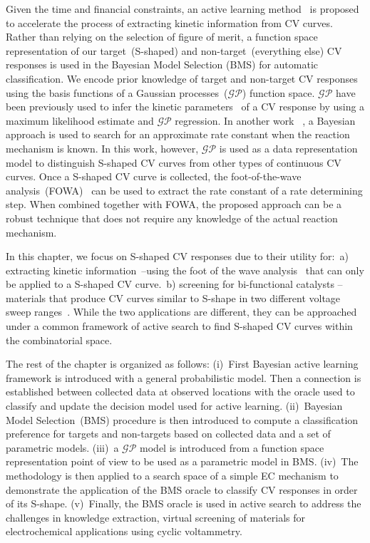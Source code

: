 Given the time and financial constraints, an active learning method~\cite{jiang2018efficient,RGActiveIntro, GardnerALIntro} is proposed to accelerate the process of extracting kinetic information from CV curves. 
Rather than relying on the selection of figure of merit, a function space representation of our target~(S-shaped) and non-target~(everything else) CV responses is used in the Bayesian Model Selection (BMS) for automatic classification. 
We encode prior knowledge of target and non-target CV responses using the basis functions of a Gaussian processes~(\(\mathcal{GP}\)) function space.
\(\mathcal{GP}\) have been previously used to infer the kinetic parameters~\cite{gavaghan2018use,robinson2018separating} of a CV response by using a maximum likelihood estimate and \(\mathcal{GP}\) regression. 
In another work ~\cite{li2019application}, a Bayesian approach is used to search for an approximate rate constant when the reaction mechanism is known. 
In this work, however, \(\mathcal{GP}\) is used as a data representation model to distinguish S-shaped CV curves from other types of continuous CV curves. 
Once a S-shaped CV curve is collected, the foot-of-the-wave analysis~(FOWA)~\cite{FOWA} can be used to extract the rate constant of a rate determining step. 
When combined together with FOWA, the proposed approach can be a robust technique that does not require any knowledge of the actual reaction mechanism.

In this chapter, we focus on S-shaped CV responses due to their utility for:~a) extracting kinetic information~\cite{costentin2015cyclic, rountree2014evaluation}--using the foot of the wave analysis~\cite{FOWA} that can only be applied to a S-shaped CV curve.~b) screening for bi-functional catalysts -- materials that produce CV curves similar to S-shape in two different voltage sweep ranges~\cite{bradley2019reversible, jung2016optimizing}. 
While the two applications are different, they can be approached under a common framework of active search to find S-shaped CV curves within the combinatorial space. 


The rest of the chapter is organized as follows: (i)~First  Bayesian active learning framework is introduced with a general probabilistic model. Then a connection is established between collected data at observed locations with the oracle used to classify and update the decision model used for active learning. (ii)~Bayesian Model Selection~(BMS) procedure is then introduced to compute a classification preference for targets and non-targets based on collected data and a set of parametric models. (iii)~a \(\mathcal{GP}\) model is introduced from a function space representation point of view to be used as a parametric model in BMS.  (iv)~The methodology is then applied to a search space of a simple EC mechanism to demonstrate the application of the BMS oracle to classify CV responses in order of its S-shape. (v)~Finally, the BMS oracle is used in active search to address the challenges in knowledge extraction, virtual screening of materials for electrochemical applications using cyclic voltammetry.